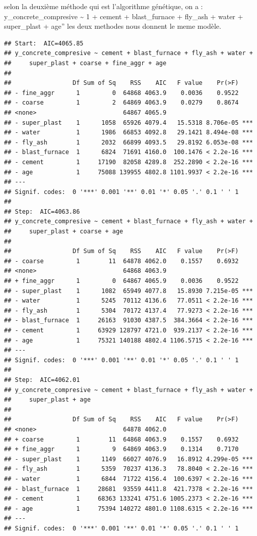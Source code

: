 \documentclass[
  12pt,
]{article}
\begin{document}
selon la deuxième méthode qui est l'algorithme génétique, on a :
y\_concrete\_compresive \textasciitilde{} 1 + cement + blast\_furnace +
fly\_ash + water + super\_plast + age'' les deux methodes nous donnent
le meme modèle.

\begin{verbatim}
## Start:  AIC=4065.85
## y_concrete_compresive ~ cement + blast_furnace + fly_ash + water + 
##     super_plast + coarse + fine_aggr + age
## 
##                 Df Sum of Sq    RSS    AIC   F value    Pr(>F)    
## - fine_aggr      1         0  64868 4063.9    0.0036    0.9522    
## - coarse         1         2  64869 4063.9    0.0279    0.8674    
## <none>                        64867 4065.9                        
## - super_plast    1      1058  65926 4079.4   15.5318 8.706e-05 ***
## - water          1      1986  66853 4092.8   29.1421 8.494e-08 ***
## - fly_ash        1      2032  66899 4093.5   29.8192 6.053e-08 ***
## - blast_furnace  1      6824  71691 4160.0  100.1476 < 2.2e-16 ***
## - cement         1     17190  82058 4289.8  252.2890 < 2.2e-16 ***
## - age            1     75088 139955 4802.8 1101.9937 < 2.2e-16 ***
## ---
## Signif. codes:  0 '***' 0.001 '**' 0.01 '*' 0.05 '.' 0.1 ' ' 1
## 
## Step:  AIC=4063.86
## y_concrete_compresive ~ cement + blast_furnace + fly_ash + water + 
##     super_plast + coarse + age
## 
##                 Df Sum of Sq    RSS    AIC   F value    Pr(>F)    
## - coarse         1        11  64878 4062.0    0.1557    0.6932    
## <none>                        64868 4063.9                        
## + fine_aggr      1         0  64867 4065.9    0.0036    0.9522    
## - super_plast    1      1082  65949 4077.8   15.8930 7.215e-05 ***
## - water          1      5245  70112 4136.6   77.0511 < 2.2e-16 ***
## - fly_ash        1      5304  70172 4137.4   77.9273 < 2.2e-16 ***
## - blast_furnace  1     26163  91030 4387.5  384.3664 < 2.2e-16 ***
## - cement         1     63929 128797 4721.0  939.2137 < 2.2e-16 ***
## - age            1     75321 140188 4802.4 1106.5715 < 2.2e-16 ***
## ---
## Signif. codes:  0 '***' 0.001 '**' 0.01 '*' 0.05 '.' 0.1 ' ' 1
## 
## Step:  AIC=4062.01
## y_concrete_compresive ~ cement + blast_furnace + fly_ash + water + 
##     super_plast + age
## 
##                 Df Sum of Sq    RSS    AIC   F value    Pr(>F)    
## <none>                        64878 4062.0                        
## + coarse         1        11  64868 4063.9    0.1557    0.6932    
## + fine_aggr      1         9  64869 4063.9    0.1314    0.7170    
## - super_plast    1      1149  66027 4076.9   16.8912 4.299e-05 ***
## - fly_ash        1      5359  70237 4136.3   78.8040 < 2.2e-16 ***
## - water          1      6844  71722 4156.4  100.6397 < 2.2e-16 ***
## - blast_furnace  1     28681  93559 4411.8  421.7378 < 2.2e-16 ***
## - cement         1     68363 133241 4751.6 1005.2373 < 2.2e-16 ***
## - age            1     75394 140272 4801.0 1108.6315 < 2.2e-16 ***
## ---
## Signif. codes:  0 '***' 0.001 '**' 0.01 '*' 0.05 '.' 0.1 ' ' 1
\end{verbatim}
\end{document}

